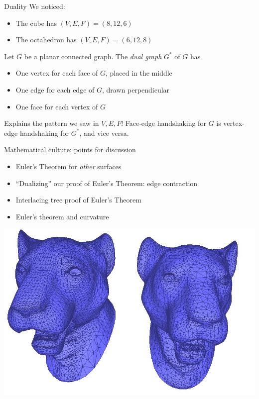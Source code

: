 \documentclass{beamer}
\begin{document}
\begin{frame}{Duality}
  We noticed:
  \begin{itemize}
    \item The cube has $(V, E, F)=(8,12,6)$
    \item The octahedron has $(V, E, F)=(6,12,8)$
  \end{itemize}

  \begin{definition}Let $G$ be a planar connected graph.  The \emph{dual graph} $G^*$ of $G$ has
    \begin{itemize}
    \item One vertex for each face of $G$, placed in the middle
    \item One edge for each edge of $G$, drawn perpendicular
    \item One face for each vertex of $G$
    \end{itemize}
  \end{definition}
\begin{block}{Explains the pattern we saw in $V, E, F$!}
 Face-edge handshaking for $G$ is vertex-edge handshaking for $G^*$, and vice versa.
  \end{block}
  
  \end{frame}

\begin{frame}{Mathematical culture: points for discussion}

\begin{itemize}
\item Euler's Theorem for \emph{other} surfaces
\item ``Dualizing'' our proof of Euler's Theorem: edge contraction
\item Interlacing tree proof of Euler's Theorem
\item Euler's theorem and curvature
\end{itemize}
\begin{center}
\includegraphics[width=.7\textwidth]{Pictures/mesh.jpg}
\end{center}
\end{frame}
\end{document}
